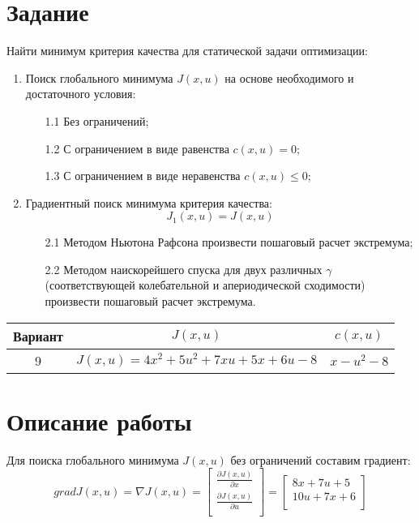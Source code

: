 \documentclass[14pt, a4paper]{extarticle}
\begin{document}
	\onehalfspacing
	
	\setcounter{page}{2}

	\section*{Задание}
	
	Найти минимум критерия качества для статической задачи оптимизации:
	\begin{enumerate}
		\item Поиск глобального минимума $J(x,u)$ на основе необходимого и достаточного условия:
		\begin{enumerate}
			\item[1.1] Без ограничений;
			\item[1.2] С ограничением в виде равенства $c(x,u)=0$;
			\item[1.3] С ограничением в виде неравенства $c(x,u)\le0$; 
		\end{enumerate}
		\item Градиентный поиск минимума критерия качества:
		$$J_1(x,u)=J(x,u)$$
		\begin{enumerate}
			\item[2.1] Методом Ньютона Рафсона произвести пошаговый расчет экстремума;
			\item[2.2] Методом наискорейшего спуска для двух различных $\gamma$ (соответствующей колебательной и апериодической сходимости) произвести пошаговый расчет экстремума. 
		\end{enumerate}
	\end{enumerate}
	\begin{table}[H]
		\centering
		\begin{tabular}{|c|c|c|}
			\hline
			Вариант & $J(x,u)$ & $c(x,u)$ \\\hline
			9 & $J(x,u)=4x^2+5u^2+7xu+5x+6u-8$ & $x-u^2-8$ \\\hline
		\end{tabular}
	\end{table}
	
	\newpage
	
	\section*{Описание работы}
	
	Для поиска глобального минимума $J(x,u)$ без ограничений составим градиент:
	$$gradJ(x,u)=\nabla J(x,u)=\left[\begin{matrix}
		\frac{\partial J(x,u)}{\partial x} \\
		\frac{\partial J(x,u)}{\partial u} \\
	\end{matrix}\right]=\left[\begin{matrix}
		8x+7u+5 \\
		10u+7x+6 \\
	\end{matrix}\right]$$
	
\end{document}
